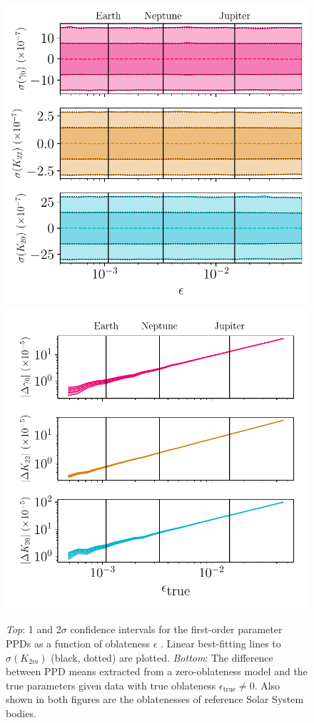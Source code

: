 \documentclass[fleqn,usenatbib]{mnras}
\begin{document}
\begin{figure}
  \centering
  \includegraphics[width=0.88\columnwidth]{figs/oblateness.pdf}
  \vfill
  \includegraphics[width=0.88\columnwidth]{figs/oblateness-differ.pdf}
  \caption{\textit{Top}: 1 and 2$\sigma$ confidence intervals for the first-order parameter PPDs as a function of oblateness $\epsilon$ . Linear best-fitting lines to $\sigma(K_{2m})$ (black, dotted) are plotted. \textit{Bottom}: The difference between PPD means extracted from a zero-oblateness model and the true parameters given data with true oblateness $\epsilon_\text{true} \neq 0$. Also shown in both figures are the oblatenesses of reference Solar System bodies.}
  \label{fig:scan-oblateness}
\end{figure}
\end{document}

